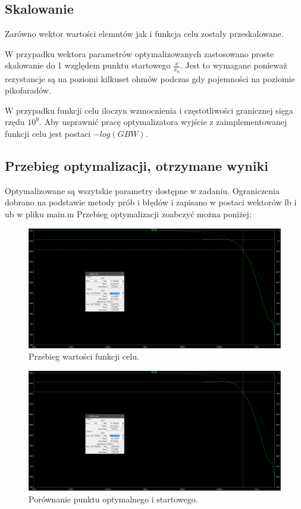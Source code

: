 \documentclass{article}
\begin{document}
\subsection*{Skalowanie}
Zarówno wektor wartości elemntów jak i funkcja celu zostały przeskalowane. 

W przypadku wektora parametrów optymalizowanych zastosowano proste skalowanie do 1 względem punktu startowego $\frac{x}{x_0}$.
Jest to wymagane ponieważ rezystancje są na poziomi kilkuset ohmów podczas gdy pojemności na poziomie pikofaradów.

W przypadku funkcji celu iloczyn wzmocnienia i częstotliwości granicznej sięga rzędu $10^9$. 
Aby usprawnić pracę optymalizatora wyjście z zaimplementowanej funkcji celu jest postaci $-log(GBW)$.
\pagebreak
\subsection{Przebieg optymalizacji, otrzymane wyniki}
Optymalizowane są wszytskie parametry dostępne w zadaniu. Ograniczenia dobrano na podstawie metody prób i błędów i zapisano w postaci wektorów lb i ub w pliku main.m 
Przebieg optymalizacji zoabczyć można poniżej:


\begin{figure}[h]
	\includegraphics[width=12cm]{graphics/starting_point_spice.png}
	\centering
	\caption{Przebieg wartości funkcji celu.}
\end{figure}

\begin{figure}[h]
	\includegraphics[width=12cm]{graphics/starting_point_spice.png}
	\centering
	\caption{Porównanie punktu optymalnego i startowego.}
\end{figure}
\end{document}
